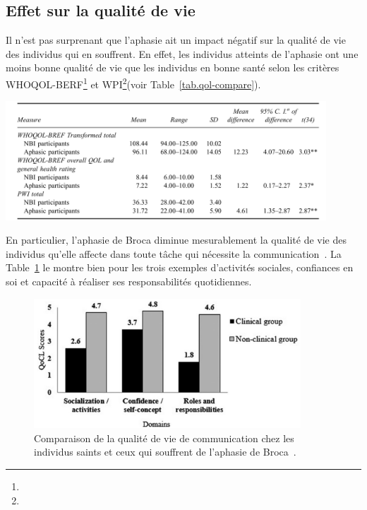 \subsection{Effet sur la qualité de vie}

Il n'est pas surprenant que l'aphasie ait un impact négatif sur la qualité de vie des individus qui en souffrent.
En effet, les individus atteints de l'aphasie ont une moins bonne qualité de vie que les individus en bonne santé
selon les critères WHOQOL-BERF\footnote{} 
et WPI\footnote{}(voir Table~\ref{tab.qol-compare}).

\begin{table}[hbt]
    \centering
    \includegraphics[width=12cm]{assets/images/qol.png}
    \caption[Comparaison de la qualité de vie chez les individus saints et ceux qui souffrent d'une aphasie.]%
    {Comparaison de la qualité de vie chez les individus saints et ceux qui souffrent d'une aphasie~\cite{Ross_Wertz_2010}.}
    \label{tab.qol-compare}
\end{table}

En particulier, l'aphasie de Broca diminue mesurablement la qualité de vie des individus qu'elle affecte
dans toute tâche qui nécessite la communication~\cite{Pallavi_Perumal_Krupa_2018}. 
La Table~\ref{fig.qocl-compare} le montre bien pour les trois exemples d'activités sociales, confiances en soi
et capacité à réaliser ses responsabilités quotidiennes.

\begin{figure}[hbt]
    \centering
    \includegraphics[width=10cm]{assets/images/qocl.png}
    \caption[Comparaison de la qualité de vie de communication chez les individus saints et ceux qui souffrent de l'aphasie de Broca.]%
    {Comparaison de la qualité de vie de communication chez les individus saints et ceux qui souffrent de l'aphasie de Broca~\cite{Pallavi_Perumal_Krupa_2018}.}
    \label{fig.qocl-compare}
\end{figure}

